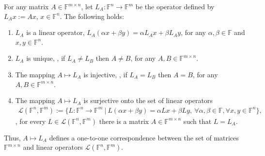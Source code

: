 \begin{theorem}
\label{conclusion:thm:matrix-linop}
For any matrix $A \in \mathbb{F}^{m \times n}$, let $L_A : \mathbb{F}^n
\rightarrow \mathbb{F}^m$ be the operator defined by $L_Ax := Ax$, $x \in
\mathbb{F}^n$. The following holds:
\begin{enumerate}
\item $L_A$ is a linear operator, \ie $L_A(\alpha x + \beta y) = \alpha L_A x +
\beta L_A y$, for any $\alpha,\beta \in \mathbb{F}$ and $x, y \in \mathbb{F}^n$.
\item $L_A$ is unique, \ie, if $L_A \neq L_B$ then $A \neq B$, for any $A, B
\in \mathbb{F}^{m \times n}$.
\item The mapping $A \mapsto L_A$ is injective, \ie, if $L_A = L_B$ then $A
= B$, for any $A, B \in \mathbb{F}^{m \times n}$.
\item The mapping $A \mapsto L_A$ is surjective onto the set of linear operators
\begin{align}
\mathcal{L}(\mathbb{F}^n,\mathbb{F}^m) := \lbrace L : \mathbb{F}^n \rightarrow
\mathbb{F}^m \ \vert \ L(\alpha x + \beta y) = \alpha Lx + \beta Ly, \ \forall
\alpha, \beta \in \mathbb{F}, \forall x, y \in \mathbb{F}^n \rbrace,
\end{align}
\ie, for every $L \in \mathcal{L}(\mathbb{F}^n,\mathbb{F}^m)$ there is a
matrix $A \in \mathbb{F}^{m \times n}$ such that $L = L_A$.
\end{enumerate}
Thus, $A \mapsto L_A$ defines a one-to-one correspondence between the set of
matrices $\mathbb{F}^{m \times n}$ and linear operators
$\mathcal{L}(\mathbb{F}^n, \mathbb{F}^m)$.
\end{theorem}
